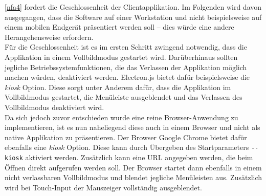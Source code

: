 \ref{nfa4} fordert die Geschlossenheit der Clientapplikation. Im Folgenden wird davon ausgegangen, 
dass die Software auf einer Workstation und nicht beispielsweise auf einem mobilen Endgerät präsentiert
werden soll -- dies würde eine andere Herangehensweise erfordern.\\
Für die Geschlossenheit ist es im ersten Schritt zwingend notwendig, dass die Applikation in einem 
Vollbildmodus gestartet wird. Darüberhinaus sollten jegliche Betriebssystemfunktionen, die das 
Verlassen der Applikation möglich machen würden, deaktiviert werden. Electron.js bietet dafür beispielsweise
die \emph{kiosk} Option. Diese sorgt unter Anderem dafür, dass die Applikation im Vollbildmodus gestartet, 
die Menüleiste ausgeblendet und das Verlassen des Vollbildmodus deaktiviert wird.\\
Da sich jedoch zuvor entschieden wurde eine reine Browser-Anwendung zu implementieren, ist es nun naheliegend 
diese auch in einem Browser und nicht als native Applikation zu präsentieren. Der Browser Google Chrome bietet
dafür ebenfalls eine \emph{kiosk} Option. Diese kann durch Übergeben des Startparameters \texttt{-{}-kiosk}
aktiviert werden. Zusätzlich kann eine URL angegeben werden, die beim Öffnen direkt aufgerufen werden soll.
Der Browser startet dann ebenfalls in einem nicht verlassbaren Vollbildmodus und blendet jegliche Menüleisten aus.
Zusätzlich wird bei Touch-Input der Mauszeiger vollständig ausgeblendet.\\
